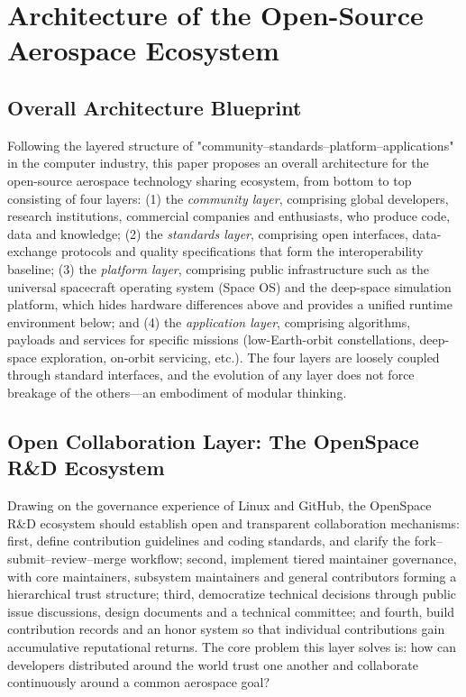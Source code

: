 \documentclass[11pt]{article}
\begin{document}
\section{Architecture of the Open-Source Aerospace Ecosystem}
\subsection{Overall Architecture Blueprint}
Following the layered structure of "community--standards--platform--applications" in the computer industry, this paper proposes an overall architecture for the open-source aerospace technology sharing ecosystem, from bottom to top consisting of four layers: (1) the \emph{community layer}, comprising global developers, research institutions, commercial companies and enthusiasts, who produce code, data and knowledge; (2) the \emph{standards layer}, comprising open interfaces, data-exchange protocols and quality specifications that form the interoperability baseline; (3) the \emph{platform layer}, comprising public infrastructure such as the universal spacecraft operating system (Space OS) and the deep-space simulation platform, which hides hardware differences above and provides a unified runtime environment below; and (4) the \emph{application layer}, comprising algorithms, payloads and services for specific missions (low-Earth-orbit constellations, deep-space exploration, on-orbit servicing, etc.). The four layers are loosely coupled through standard interfaces, and the evolution of any layer does not force breakage of the others---an embodiment of modular thinking.

\subsection{Open Collaboration Layer: The OpenSpace R\&D Ecosystem}
Drawing on the governance experience of Linux and GitHub, the OpenSpace R\&D ecosystem should establish open and transparent collaboration mechanisms: first, define contribution guidelines and coding standards, and clarify the fork--submit--review--merge workflow; second, implement tiered maintainer governance, with core maintainers, subsystem maintainers and general contributors forming a hierarchical trust structure; third, democratize technical decisions through public issue discussions, design documents and a technical committee; and fourth, build contribution records and an honor system so that individual contributions gain accumulative reputational returns. The core problem this layer solves is: how can developers distributed around the world trust one another and collaborate continuously around a common aerospace goal?
\end{document}
